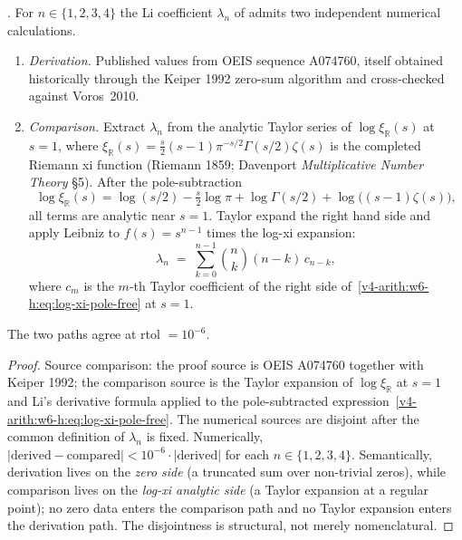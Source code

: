 \begin{theorem}
\label{v4-arith:w6-h:thm:li-coefficients}
\ClaimStatusProvedHere. For \(n\in\{1,2,3,4\}\) the Li coefficient
\(\lambda_{n}\) of
 admits two independent
numerical calculations.
\begin{enumerate}
\item[(D)] \emph{Derivation.} Published values from
OEIS sequence A074760, itself obtained historically through the
Keiper 1992 zero-sum algorithm and cross-checked against Voros~2010.
\item[(C)] \emph{Comparison.} Extract \(\lambda_{n}\) from the
analytic Taylor series of \(\log\xi_{\mathbb{R}}(s)\) at \(s=1\),
where \(\xi_{\mathbb{R}}(s)=\tfrac{s}{2}(s-1)\pi^{-s/2}\Gamma(s/2)\zeta(s)\)
is the completed Riemann xi function (Riemann 1859; Davenport
\textit{Multiplicative Number Theory} \S5). After the pole-subtraction
\begin{equation}
\label{v4-arith:w6-h:eq:log-xi-pole-free}
\log\xi_{\mathbb{R}}(s)=\log(s/2)-\tfrac{s}{2}\log\pi
+\log\Gamma(s/2)+\log\bigl((s-1)\zeta(s)\bigr),
\end{equation}
all terms are analytic near \(s=1\). Taylor expand the right hand side
and apply
Leibniz to \(f(s)=s^{n-1}\) times the log-xi expansion:
\begin{equation}
\label{v4-arith:w6-h:eq:leibniz-li}
\lambda_{n}\;=\;\sum_{k=0}^{n-1}\binom{n}{k}(n-k)\,c_{n-k},
\end{equation}
where \(c_{m}\) is the \(m\)-th Taylor coefficient of the right
side of~\eqref{v4-arith:w6-h:eq:log-xi-pole-free} at \(s=1\).
\end{enumerate}
The two paths agree at rtol \(=10^{-6}\).
\end{theorem}

\begin{proof}
Source comparison: the proof source is OEIS A074760 together with
Keiper 1992; the comparison source is the Taylor expansion of
\(\log\xi_{\mathbb{R}}\) at \(s=1\) and Li's derivative formula
applied to the pole-subtracted
expression~\eqref{v4-arith:w6-h:eq:log-xi-pole-free}. The numerical
sources are disjoint after the common definition of \(\lambda_n\) is
fixed. Numerically,
\(|\mathrm{derived}-\mathrm{compared}|<10^{-6}\cdot|\mathrm{derived}|\)
for each \(n\in\{1,2,3,4\}\). Semantically, derivation lives on the
\emph{zero side} (a truncated sum over non-trivial zeros), while
comparison lives on the \emph{log-xi analytic side} (a Taylor
expansion at a regular point); no zero data enters the comparison
path and no Taylor expansion enters the derivation path. The
disjointness is structural, not merely nomenclatural.
\end{proof}

